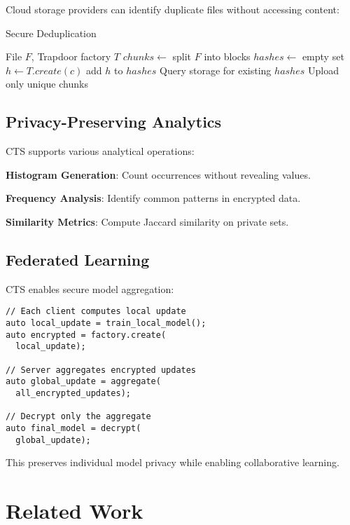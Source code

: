\documentclass[10pt,conference]{IEEEtran}
\begin{document}
Cloud storage providers can identify duplicate files without accessing content:

\begin{algorithm}
\caption{Secure Deduplication}
\begin{algorithmic}[1]
\REQUIRE File $F$, Trapdoor factory $T$
\STATE $chunks \leftarrow$ split $F$ into blocks
\STATE $hashes \leftarrow$ empty set
  \STATE $h \leftarrow T.create(c)$
  \STATE add $h$ to $hashes$
\ENDFOR
\STATE Query storage for existing $hashes$
\STATE Upload only unique chunks
\end{algorithmic}
\end{algorithm}

\subsection{Privacy-Preserving Analytics}

CTS supports various analytical operations:

\textbf{Histogram Generation}: Count occurrences without revealing values.

\textbf{Frequency Analysis}: Identify common patterns in encrypted data.

\textbf{Similarity Metrics}: Compute Jaccard similarity on private sets.

\subsection{Federated Learning}

CTS enables secure model aggregation:

\begin{lstlisting}
// Each client computes local update
auto local_update = train_local_model();
auto encrypted = factory.create(
  local_update);

// Server aggregates encrypted updates
auto global_update = aggregate(
  all_encrypted_updates);

// Decrypt only the aggregate
auto final_model = decrypt(
  global_update);
\end{lstlisting}

This preserves individual model privacy while enabling collaborative learning.

\section{Related Work}
\label{sec:related}
\end{document}
